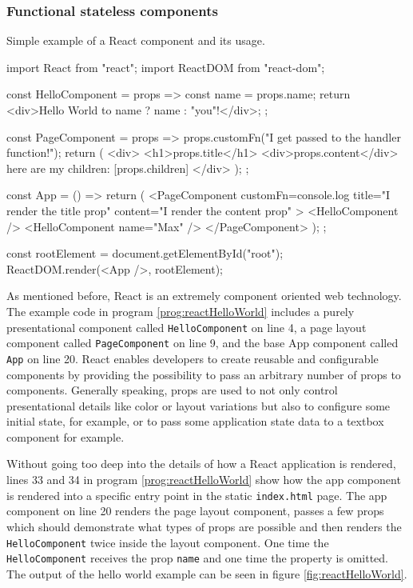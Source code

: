 \subsubsection{Functional stateless components}

\begin{program}
\caption{Simple example of a React component and its usage.} 
\label{prog:reactHelloWorld}
\begin{JsCode}
import React from "react";
import ReactDOM from "react-dom";

const HelloComponent = props => {
  const name = props.name;
  return <div>Hello World to {name ? name : "you"}!</div>;
};

const PageComponent = props => {
  props.customFn("I get passed to the handler function!");
  return (
    <div>
      <h1>{props.title}</h1>
      <div>{props.content}</div>
      here are my children: [{props.children}]
    </div>
  );
};

const App = () => {
  return (
    <PageComponent
      customFn={console.log}
      title="I render the title prop"
      content="I render the content prop"
    >
      <HelloComponent />
      <HelloComponent name={"Max"} />
    </PageComponent>
  );
};

const rootElement = document.getElementById("root");
ReactDOM.render(<App />, rootElement);  
\end{JsCode}
\end{program}

As mentioned before, React is an extremely component oriented web technology. The example code in program \ref{prog:reactHelloWorld} includes a purely presentational component called \texttt{Hello\-Component} on line 4, a page layout component called \texttt{PageComponent} on line 9, and the base App component called \texttt{App} on line 20. React enables developers to create reusable and configurable components by providing the possibility to pass an arbitrary number of props to components. Generally speaking, props are used to not only control presentational details like color or layout variations but also to configure some initial state, for example, or to pass some application state data to a textbox component for example.

Without going too deep into the details of how a React application is rendered, lines 33 and 34 in program \ref{prog:reactHelloWorld} show how the app component is rendered into a specific entry point in the static \texttt{index.html} page. The app component on line 20 renders the page layout component, passes a few props which should demonstrate what types of props are possible and then renders the \texttt{HelloComponent} twice inside the layout component. One time the \texttt{HelloComponent} receives the prop \texttt{name} and one time the property is omitted. The output of the hello world example can be seen in figure \ref{fig:reactHelloWorld}. 

